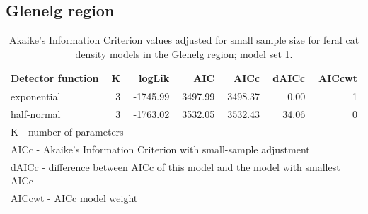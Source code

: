 \documentclass[]{elsarticle} %
\begin{document}
\hypertarget{glenelg-region-2}{%
\subsection{Glenelg region}\label{glenelg-region-2}}

\begingroup\fontsize{10}{12}\selectfont

\begin{longtable}[t]{lrrrrrr}
\caption{\label{tab:density-aic-g-1}Akaike's Information Criterion values adjusted for small sample size for feral cat density models in the Glenelg region; model set 1.}\\
\toprule
Detector function & K & logLik & AIC & AICc & dAICc & AICcwt\\
\midrule
exponential & 3 & -1745.99 & 3497.99 & 3498.37 & 0.00 & 1\\
half-normal & 3 & -1763.02 & 3532.05 & 3532.43 & 34.06 & 0\\
\bottomrule
\multicolumn{7}{l}{\rule{0pt}{1em}K - number of parameters}\\
\multicolumn{7}{l}{\rule{0pt}{1em}AICc - Akaike's Information Criterion with small-sample adjustment}\\
\multicolumn{7}{l}{\rule{0pt}{1em}dAICc - difference between AICc of this model and the model with smallest AICc}\\
\multicolumn{7}{l}{\rule{0pt}{1em}AICcwt - AICc model weight}\\
\end{longtable}
\endgroup{}

\newpage

\begingroup\fontsize{10}{12}\selectfont
\end{document}
